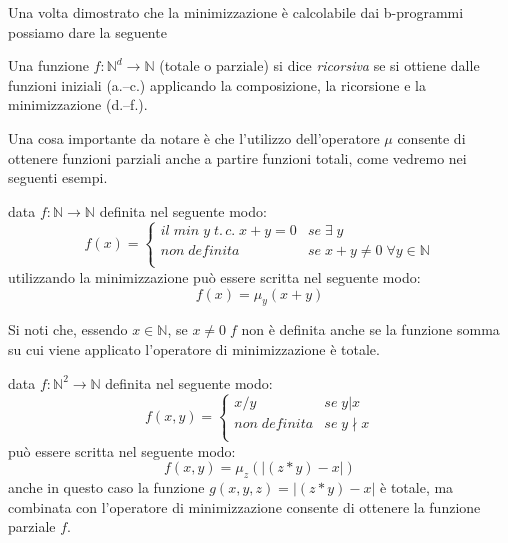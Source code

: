 Una volta dimostrato che la minimizzazione è calcolabile dai
b-programmi possiamo dare la seguente
\begin{defi} Una funzione $f:\mathbb{N}^{d} \to \mathbb{N}$ (totale o
parziale) si dice \emph{ricorsiva} se si ottiene dalle funzioni
iniziali (a.--c.) applicando la composizione, la ricorsione e la
minimizzazione (d.--f.).
\end{defi}

Una cosa importante da notare \`e che l'utilizzo dell'operatore $\mu$ consente
di ottenere funzioni parziali anche a partire funzioni totali, come vedremo nei
seguenti esempi.
\begin{esempio} data $f:\mathbb{N} \to \mathbb{N}$ definita nel seguente modo:
$$f(x)= \left\{ \begin{array}{ll}
il \; min \; y \; t. \, c. \; x+y=0 & se \; \exists \; y\\
non \; definita & se \; x+y \neq 0 \; \forall y \in \mathbb{N}\\
\end{array} \right.$$
utilizzando la minimizzazione pu\`o essere scritta nel seguente modo:
$$f(x)= \mu_{y}(x+y)$$

Si noti che, essendo $x \in \mathbb{N}$, se $x \neq 0 \; f$ non \`e definita
anche se la funzione somma su cui viene applicato l'operatore di minimizzazione
\`e totale.
\end{esempio}

\begin{esempio} data $f:\mathbb{N}^{2} \to \mathbb{N}$ definita nel seguente
modo:
$$f(x,y)= \left\{ \begin{array}{ll}
x/y & se \; y \vert x\\
non \; definita & se \; y \nmid x\\
\end{array} \right.$$
pu\`o essere scritta nel seguente modo:
$$f(x,y) = \mu_{z}(\vert (z*y) - x \vert) $$
anche in questo caso la funzione $g(x,y,z)=\vert (z*y) - x \vert$ \`e totale, ma
combinata con l'operatore di minimizzazione consente di ottenere la funzione
parziale $f$.
\end{esempio}

